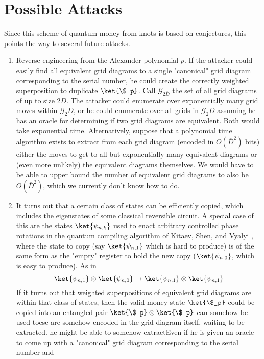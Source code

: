 \section{Possible Attacks}

Since this scheme of quantum money from knots is based on conjectures, this
points the way to several future attacks.

\begin{enumerate}
\item Reverse engineering from the Alexander polynomial $p$. If the attacker
could easily find all equivalent grid diagrams to a single "canonical" grid
diagram corresponding to the serial number, he could create the correctly
weighted superposition to duplicate $\ket{\$_p}$. Call
$\mathcal{G}_{2\overline{D}}$ the set of all grid diagrams of up to size
$2\overline{D}$.
The attacker could enumerate over
exponentially many grid moves within $\mathcal{G}_2\overline{D}$,
or he could enumerate over all grids in $\mathcal{G}_2\overline{D}$ assuming
he has an oracle for determining if two grid diagrams are equivalent.
Both would take exponential time.
Alternatively, suppose that a polynomial time algorithm exists to extract from
each grid diagram
(encoded in $O(\overline{D}^2)$
bits) either the moves to get to all but exponentially many equivalent
diagrams or (even more unlikely) the equivalent diagrams themselves.
We would have to be able to upper bound the number of equivalent grid diagrams to
also be $O(\overline{D}^2)$, which we currently don't know how to do.
\item
It turns out that a certain class of states can be efficiently copied, which
includes the eigenstates of some classical reversible circuit.
A special case of this
are the states $\ket{\psi_{n,k}}$ used to enact arbitrary controlled phase
rotations in the quantum compiling algorithm of Kitaev, Shen, and Vyalyi
\cite{KSV02}, where the state to copy (say $\ket{\psi_{n,1}}$ which is hard
to produce) is of the
same form as the "empty" register to hold the new copy ($\ket{\psi_{n,0}}$, which
is easy to produce). As in
\begin{displaymath}
\ket{\psi_{n,1}}\otimes\ket{\psi_{n,0}} \rightarrow
\ket{\psi_{n,1}}\otimes\ket{\psi_{n,1}}
\end{displaymath}
If it turns out that weighted superpositions of equivalent
grid diagrams are within that class of states, then the valid money state
$\ket{\$_p}$ could be copied into an entangled pair
$\ket{\$_p} \otimes \ket{\$_p}$
can somehow be used toese are somehow encoded in the grid diagram itself,
waiting to be extracted.
he might be able to somehow extractEven if he is given an
oracle to 
come up with a "canonical" grid diagram corresponding to the serial number and

\end{enumerate}